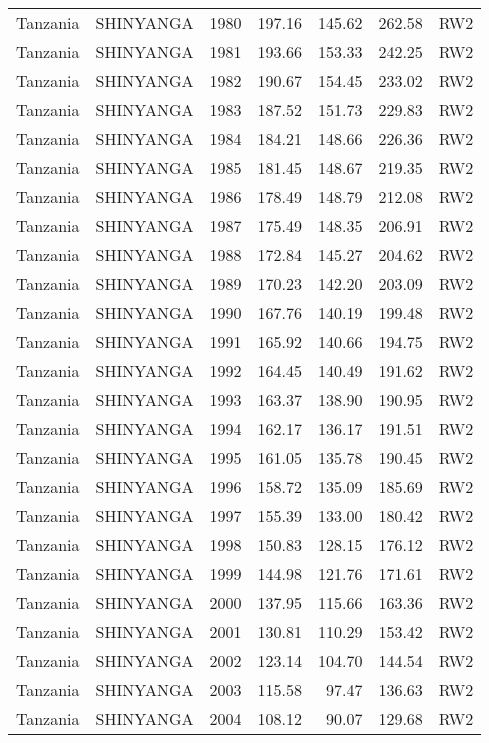 \begin{longtable}{lllrrrl}
  Tanzania & SHINYANGA & 1980 & 197.16 & 145.62 & 262.58 & RW2 \\ 
  Tanzania & SHINYANGA & 1981 & 193.66 & 153.33 & 242.25 & RW2 \\ 
  Tanzania & SHINYANGA & 1982 & 190.67 & 154.45 & 233.02 & RW2 \\ 
  Tanzania & SHINYANGA & 1983 & 187.52 & 151.73 & 229.83 & RW2 \\ 
  Tanzania & SHINYANGA & 1984 & 184.21 & 148.66 & 226.36 & RW2 \\ 
  Tanzania & SHINYANGA & 1985 & 181.45 & 148.67 & 219.35 & RW2 \\ 
  Tanzania & SHINYANGA & 1986 & 178.49 & 148.79 & 212.08 & RW2 \\ 
  Tanzania & SHINYANGA & 1987 & 175.49 & 148.35 & 206.91 & RW2 \\ 
  Tanzania & SHINYANGA & 1988 & 172.84 & 145.27 & 204.62 & RW2 \\ 
  Tanzania & SHINYANGA & 1989 & 170.23 & 142.20 & 203.09 & RW2 \\ 
  Tanzania & SHINYANGA & 1990 & 167.76 & 140.19 & 199.48 & RW2 \\ 
  Tanzania & SHINYANGA & 1991 & 165.92 & 140.66 & 194.75 & RW2 \\ 
  Tanzania & SHINYANGA & 1992 & 164.45 & 140.49 & 191.62 & RW2 \\ 
  Tanzania & SHINYANGA & 1993 & 163.37 & 138.90 & 190.95 & RW2 \\ 
  Tanzania & SHINYANGA & 1994 & 162.17 & 136.17 & 191.51 & RW2 \\ 
  Tanzania & SHINYANGA & 1995 & 161.05 & 135.78 & 190.45 & RW2 \\ 
  Tanzania & SHINYANGA & 1996 & 158.72 & 135.09 & 185.69 & RW2 \\ 
  Tanzania & SHINYANGA & 1997 & 155.39 & 133.00 & 180.42 & RW2 \\ 
  Tanzania & SHINYANGA & 1998 & 150.83 & 128.15 & 176.12 & RW2 \\ 
  Tanzania & SHINYANGA & 1999 & 144.98 & 121.76 & 171.61 & RW2 \\ 
  Tanzania & SHINYANGA & 2000 & 137.95 & 115.66 & 163.36 & RW2 \\ 
  Tanzania & SHINYANGA & 2001 & 130.81 & 110.29 & 153.42 & RW2 \\ 
  Tanzania & SHINYANGA & 2002 & 123.14 & 104.70 & 144.54 & RW2 \\ 
  Tanzania & SHINYANGA & 2003 & 115.58 & 97.47 & 136.63 & RW2 \\ 
  Tanzania & SHINYANGA & 2004 & 108.12 & 90.07 & 129.68 & RW2 \\ 

\end{longtable}
